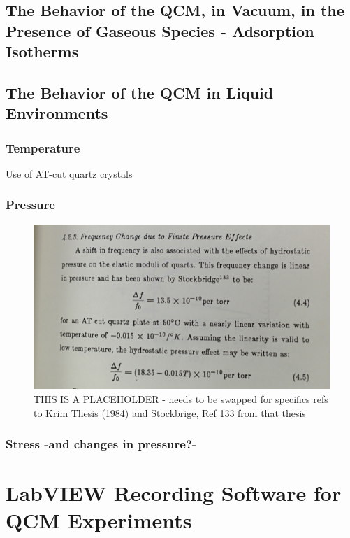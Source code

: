 \subsection{The Behavior of the QCM, in Vacuum, in the Presence of Gaseous Species - Adsorption Isotherms}



\subsection{The Behavior of the QCM in Liquid Environments}

\subsubsection{Temperature}

Use of AT-cut quartz crystals

\subsubsection{Pressure}

\begin{figure}[hbtp]
	\centering
	\includegraphics[width=1.0\textwidth]{Chapter-2/fig3_krim_thesis_QCM_pressure_effect}
	\caption{THIS IS A PLACEHOLDER - needs to be swapped for specifics refs to Krim Thesis (1984) and Stockbrige, Ref 133 from that thesis}
	\label{fig5:QCM_pressure}
\end{figure}



\subsubsection{Stress -and changes in pressure?-}

\section{LabVIEW Recording Software for QCM Experiments}


